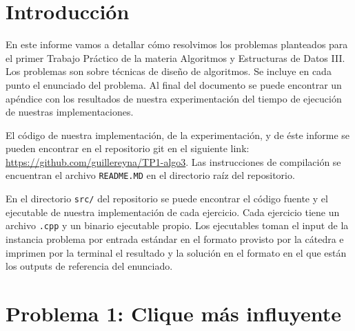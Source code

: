 \documentclass[10pt, a4paper]{article}
\begin{document}


\maketitle

\tableofcontents

\clearpage

\section*{Introducción}

En este informe vamos a detallar cómo resolvimos los problemas planteados para el primer Trabajo Práctico de la materia Algoritmos y Estructuras de Datos III. Los problemas son sobre técnicas de diseño de algoritmos. Se incluye en cada punto el enunciado del problema. Al final del documento se puede encontrar un apéndice con los resultados de nuestra experimentación del tiempo de ejecución de nuestras implementaciones.

El código de nuestra implementación, de la experimentación, y de éste informe se pueden encontrar en el repositorio git en el siguiente link: \url{https://github.com/guillereyna/TP1-algo3}. Las instrucciones de compilación se encuentran el archivo \texttt{README.MD} en el directorio raíz del repositorio.

En el directorio \texttt{src/} del repositorio se puede encontrar el código fuente y el ejecutable de nuestra implementación de cada ejercicio. Cada ejercicio tiene un archivo \texttt{.cpp} y un binario ejecutable propio. Los ejecutables toman el input de la instancia problema por entrada estándar en el formato provisto por la cátedra e imprimen por la terminal el resultado y la solución en el formato en el que están los outputs de referencia del enunciado.

\section*{Problema 1: Clique más influyente}
\end{document}
